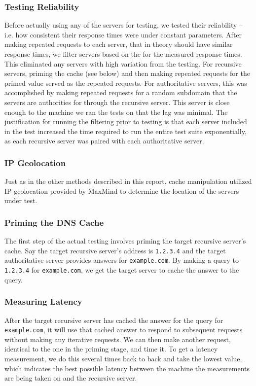 \subsubsection{Testing Reliability}
Before actually using any of the servers for testing, we tested their reliability -- i.e. how consistent their response times were under constant parameters. After making repeated requests to each server, that in theory should have similar response times, we filter servers based on the \cv for the measured response times. This eliminated any servers with high variation from the testing. For recursive servers, priming the cache (see below) and then making repeated requests for the primed value served as the repeated requests. For authoritative servers, this was accomplished by making repeated requests for a random subdomain that the servers are authorities for through the \wpi recursive \dns server. This server is close enough to the machine we ran the tests on that the lag was minimal. The justification for running the filtering prior to testing is that each server included in the test increased the time required to run the entire test suite exponentially, as each recursive server was paired with each authoritative server.

\subsubsection{IP Geolocation}
Just as in the other methods described in this report, \dns cache manipulation utilized IP geolocation provided by MaxMind to determine the location of the servers under test.

\subsubsection{Priming the DNS Cache} 
The first step of the actual testing involves priming the target recursive server's cache. Say the target recursive server's \ip address is \texttt{1.2.3.4} and the target authoritative server provides answers for \texttt{example.com}. By making a \dns query to \texttt{1.2.3.4} for \texttt{example.com}, we get the target \dns server to cache the answer to the query.

\subsubsection{Measuring Latency} 
After the target recursive server has cached the answer for the query for \texttt{example.com}, it will use that cached answer to respond to subsequent requests without making any iterative requests. We can then make another request, identical to the one in the priming stage, and time it. To get a latency measurement, we do this several times back to back and take the lowest value, which indicates the best possible latency between the machine the measurements are being taken on and the recursive server.

